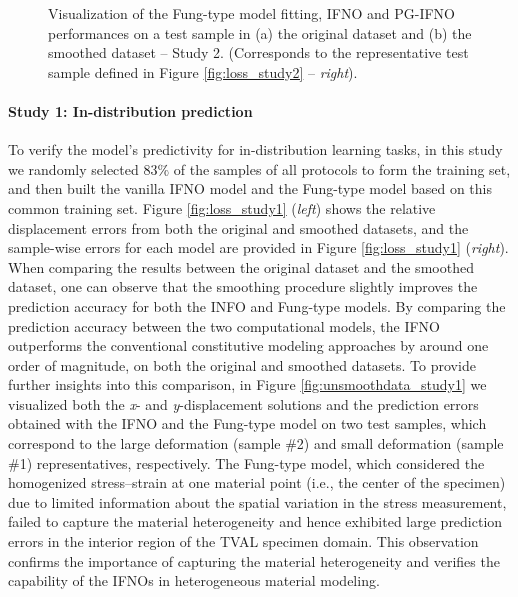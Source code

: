 \documentclass[twocolumn,10pt]{asme2ej}
\renewcommand{\~}{\tilde}
\renewcommand{\-}{\bar}
\newcommand{\8}{\infty}
\numberwithin{equation}{section}
\begin{document}
\begin{figure*}[h!]
    \centering
    \caption{Visualization of the Fung-type model fitting, IFNO and PG-IFNO performances on a test sample in (a) the original dataset and (b) the smoothed dataset -- Study 2. (Corresponds to the representative test sample defined in Figure \ref{fig:loss_study2} -- {\it right}).}
    \label{fig:unsmoothdata_study2}
\end{figure*}

\paragraph{Study 1: In-distribution prediction} To verify the model's predictivity for in-distribution learning tasks, in this study we randomly selected $83\%$ of the samples of all protocols to form the training set, and then built the vanilla IFNO model and the Fung-type model based on this common training set. Figure \ref{fig:loss_study1} ({\it left}) shows the relative displacement errors from both the original and smoothed datasets, and the sample-wise errors for each model are provided in Figure \ref{fig:loss_study1} ({\it right}). When comparing the results between the original dataset and the smoothed dataset, one can observe that the smoothing procedure slightly improves the prediction accuracy for both the INFO and Fung-type models. By comparing the prediction accuracy between the two computational models, the IFNO outperforms the conventional constitutive modeling approaches by around one order of magnitude, on both the original and smoothed datasets. To provide further insights into this comparison, in Figure  \ref{fig:unsmoothdata_study1} we visualized both the {\it x}- and {\it y}-displacement solutions and the prediction errors obtained with the IFNO and the Fung-type model on two test samples, which correspond to the large deformation (sample \#2) and small deformation (sample \#1) representatives, respectively. The Fung-type model, which considered the homogenized stress--strain at one material point (i.e., the center of the specimen) due to limited information about the spatial variation in the stress measurement,  failed to capture the material heterogeneity and hence exhibited large prediction errors in the interior region of the TVAL specimen domain. This observation confirms the importance of capturing the material heterogeneity and verifies the capability of the IFNOs in heterogeneous material modeling.
\end{document}
